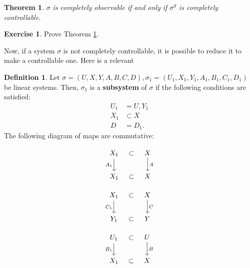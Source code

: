 \documentclass[12pt]{book}
\theoremstyle{plain}
\newtheorem{theorem}{Theorem}[section]
\theoremstyle{definition}
\newtheorem{definition}{Definition}[section]
\newtheorem{exercise}{Exercise}[section]
\begin{document}
\begin{theorem} \label{thm:CompletelyObservableIffCompletelyControllable}
    $\sigma$ is completely observable if and only if $\sigma^d$ is completely controllable.
\end{theorem}

\begin{exercise}
    Prove Theorem \ref{thm:CompletelyObservableIffCompletelyControllable}.
\end{exercise}

Now, if a system $\sigma$ is not completely controllable, it is possible to reduce it to make a controllable one.
Here is a relevant

\begin{definition}
    Let $\sigma = (U, X, Y, A, B, C, D), \sigma_1 = (U_1, X_1, Y_1, A_1, B_1, C_1, D_1)$ be linear systems.
    Then, $\sigma_1$ is a \textbf{subsystem} of $\sigma$ if the following conditions are satisfied:
    \begin{align}
        U_1 &= U, Y_1 \\
        X_1 &\subset X \\
        D &= D_1.
    \end{align}
    The following diagram of maps are commutative:
    
    \begin{equation*}
    \begin{tikzcd}[column sep=tiny]
        X_1 \ar[d,"A_1"'] & \subset & X \ar[d,"A"] \\
        X_1 & \subset & X
    \end{tikzcd}
    \end{equation*}

    \begin{equation*}
    \begin{tikzcd}[column sep=tiny]
        X_1 \ar[d,"C_1"'] & \subset & X \ar[d,"C"] \\
        Y_1 & \subset & Y
    \end{tikzcd}
    \end{equation*}

    \begin{equation*}
    \begin{tikzcd}[column sep=tiny]
        U_1 \ar[d,"B_1"'] & \subset & U \ar[d,"B"] \\
        X_1 & \subset & X
    \end{tikzcd}
    \end{equation*}
\end{definition}
\end{document}
